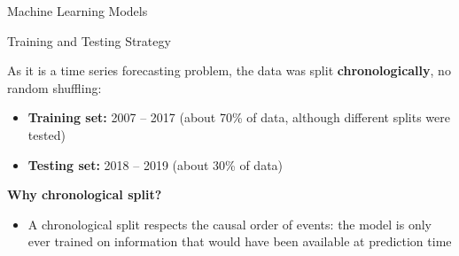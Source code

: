 \documentclass[slidescentered]{beamer}
\begin{document}
\begin{frame}
    \begin{center}
        \LARGE{Machine Learning Models}
    \end{center}

\end{frame}

\begin{frame}{Training and Testing Strategy}

    As it is a time series forecasting problem, the data was split
    \textbf{chronologically}, no random shuffling:

    \begin{itemize}
        \item \textbf{Training set:} 2007 -- 2017 \quad (about 70\% of data, although different splits were tested)
        \item \textbf{Testing set:}  2018 -- 2019 \quad (about 30\% of data)
    \end{itemize}

    \medskip

    \textbf{Why chronological split?}
    \begin{itemize}
        \item A chronological split respects the causal order of events:
              the model is only ever trained on information that would
              have been available at prediction time
    \end{itemize}

\end{frame}
\end{document}
